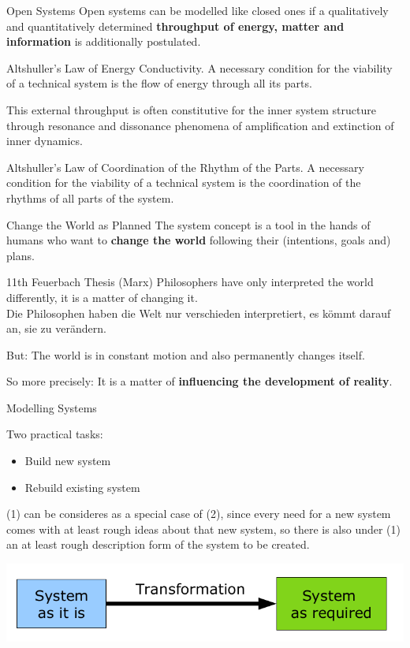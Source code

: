 \documentclass{beamer}
\begin{document}
\begin{frame}{Open Systems}
Open systems can be modelled like closed ones if a qualitatively and
quantitatively determined \textbf{throughput of energy, matter and
  information} is additionally postulated.

\begin{block}{Altshuller's Law of Energy Conductivity.}
  A necessary condition for the viability of a technical system is the flow of
  energy through all its parts.
\end{block}

This external throughput is often constitutive for the inner system structure
through resonance and dissonance phenomena of amplification and extinction of
inner dynamics.

\begin{block}{Altshuller's Law of Coordination of the Rhythm of the Parts.}
  A necessary condition for the viability of a technical system is the
  coordination of the rhythms of all parts of the system.
\end{block}
\end{frame}

\begin{frame}{Change the World as Planned}
The system concept is a tool in the hands of humans who want to \textbf{change
  the world} following their (intentions, goals and) plans.

\begin{block}{11th Feuerbach Thesis (Marx)}
  Philosophers have only interpreted the world differently, it is a matter of
  changing it.\\[4pt] Die Philosophen haben die Welt nur verschieden
  interpretiert, es kömmt darauf an, sie zu verändern.
\end{block}

But: The world is in constant motion and also permanently changes itself.

So more precisely: It is a matter of \textbf{influencing the development of
  reality}.
\end{frame}

\begin{frame}{Modelling Systems}

Two practical tasks:
\begin{itemize}
\item[(1)] Build new system
\item[(2)] Rebuild existing system
\end{itemize}

(1) can be consideres as a special case of (2), since every need for a new
system comes with at least rough ideas about that new system, so there is also
under (1) an at least rough description form of the system to be created.

\begin{center}
  \includegraphics[width=.9\textwidth]{SD-1.png}
\end{center}
\end{frame}
\end{document}

